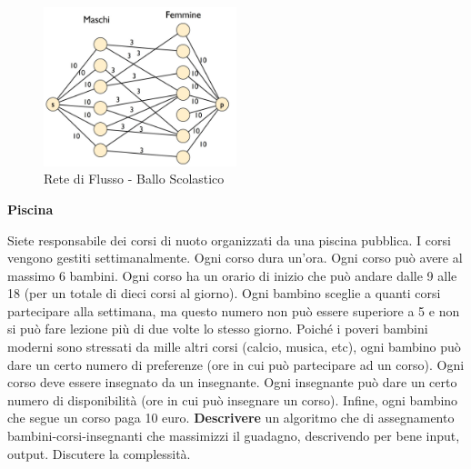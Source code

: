 \documentclass[../cheatSheetAlgoritmi.tex]{subfiles}
\begin{document}
\begin{figure}[h]
\caption{Rete di Flusso - Ballo Scolastico}
\centering
\includegraphics[width=0.5\textwidth]{../img/Locale_4.jpg}
\end{figure}
 
\begin{flushleft}
\textbf{Piscina}
\end{flushleft}
Siete responsabile dei corsi di nuoto organizzati da una piscina pubblica. I corsi vengono gestiti settimanalmente. Ogni corso dura un'ora. Ogni corso può avere al massimo 6 bambini. Ogni corso ha un orario di inizio che può andare dalle 9 alle 18 (per un totale di dieci corsi al giorno). Ogni bambino sceglie a quanti corsi partecipare alla settimana, ma questo numero non può essere superiore a 5 e non si può fare lezione più di due volte lo stesso giorno. Poiché i poveri bambini moderni sono stressati da mille altri corsi (calcio, musica, etc), ogni bambino può dare un certo numero di preferenze (ore in cui può partecipare ad un corso). Ogni corso deve essere insegnato da un insegnante. Ogni insegnante può dare un certo numero di disponibilità (ore in cui può insegnare un corso). Infine, ogni bambino che segue un corso paga 10 euro. \textbf{Descrivere} un algoritmo che di assegnamento bambini-corsi-insegnanti che massimizzi il guadagno, descrivendo per bene input, output. Discutere la complessità.
\end{document}
